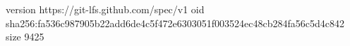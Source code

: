 version https://git-lfs.github.com/spec/v1
oid sha256:fa536c987905b22add6de4c5f472e6303051f003524ec48cb284fa56c5d4c842
size 9425
